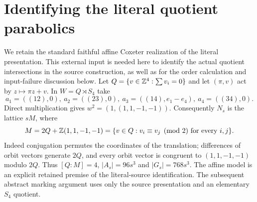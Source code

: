 \section{Identifying the literal quotient parabolics}
We retain the standard faithful affine Coxeter realization of the
literal presentation. This external input is needed here to identify
the actual quotient intersections in the source construction, as well
as for the order calculation and input-failure discussion below.
Let $Q=\{v\in\mathbb Z^4:\sum v_i=0\}$ and let $(\pi,v)$ act by
$z\mapsto\pi z+v$. In $W=Q\rtimes S_4$ take
\[
 a_1=((12),0),\ a_2=((23),0),\ a_3=((14),e_1-e_4),\ a_4=((34),0).
\]
Direct multiplication gives $w^2=(1,(1,1,-1,-1))$.
Consequently $N_s$ is the lattice $sM$, where
\[
 M=2Q+\mathbb Z(1,1,-1,-1)
  =\{v\in Q:v_i\equiv v_j\pmod2\text{ for every }i,j\}.
\]
Indeed conjugation permutes the coordinates of the translation;
differences of orbit vectors generate $2Q$, and every orbit vector
is congruent to $(1,1,-1,-1)$ modulo $2Q$. Thus $[Q:M]=4$,
$|A_s|=96s^3$ and $|G_s|=768s^3$. The affine model is an explicit retained premise of the literal-source
identification. The subsequent abstract marking argument uses only
the source presentation and an elementary $S_4$ quotient.

